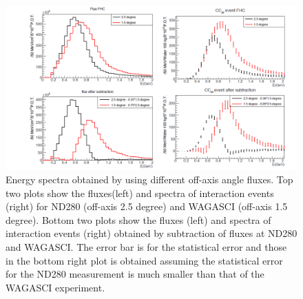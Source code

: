 \begin{figure}[tbhp]
\begin{center}
\includegraphics[width=\textwidth]{fig/fluxsubtractFHC.pdf}
\end{center}
\caption{Energy spectra obtained by using different off-axis angle fluxes.
  Top two plots show the fluxes(left) and spectra of interaction events (right) for ND280 (off-axis 2.5 degree) and WAGASCI (off-axis 1.5 degree). Bottom two plots show the fluxes (left) and spectra of interaction events (right) obtained by
  subtraction of fluxes at ND280 and WAGASCI.
  The error bar is for the statistical error and those in the bottom right plot is obtained assuming the statistical error
  for the ND280 measurement is much smaller than that of the WAGASCI experiment.
}
\label{fig:fluxsubtfhc}
\end{figure}


